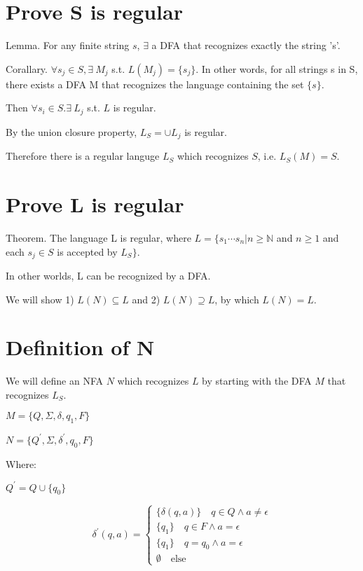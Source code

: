 \documentclass[11pt,addpoints,answers]{exam}
\newcommand{\N}{\mathbb{N}} %
\newcommand{\1}{\mathbf{1}}
\begin{document}
\pagestyle{head}                %

\medskip
 
\section{Prove S is regular}

\noindent Lemma. For any finite string $s$, $\exists$ a DFA that recognizes exactly the string 's'.

\noindent Corallary. $\forall s_j \in S, \exists \ M_j$ s.t. $L(M_j) = \{s_j\}$. In other words, for all strings s in S, there exists a DFA M that recognizes the language containing the set $\{s\}$.

\noindent Then $\forall s_i \in S . \exists \ L_j$ s.t. $L$ is regular.

\noindent By the union closure property, $ L_S = \cup L_j$ is regular.

\noindent Therefore there is a regular languge $L_S$ which recognizes $S$, i.e. $L_S(M) = S$.

\section{Prove L is regular}

\noindent Theorem. The language L is regular, where $L = \{s_1 \cdots s_n | n \geq \N$ and $n \geq 1$ and each $s_j \in S$ is accepted by $L_S \}$.

\noindent In other worlds, L can be recognized by a DFA.

\noindent We will show 1) $L(N) \subseteq L$ and 2) $L(N) \supseteq L$, by which $L(N)=L$.

\section{Definition of N}

We will define an NFA $N$ which recognizes $L$ by starting with the DFA $M$ that recognizes $L_S$.

\noindent $M = \{Q, \Sigma, \delta, q_1, F \}$

\noindent $N = \{Q^\prime, \Sigma, \delta^\prime, q_0, F \}$

\noindent Where:

\noindent $Q^\prime = Q \cup \{q_0\}$

$$
\delta^\prime(q, a) =
\begin{cases}
	\{ \delta(q, a) \}		\quad q \in Q \wedge a \neq \epsilon \\
	\{ q_1 \}			\quad q \in F \wedge a = \epsilon \\
	\{ q_1 \}			\quad q = q_0 \wedge a = \epsilon \\
	\emptyset			\quad \text{else}
\end{cases}
$$
\end{document}
